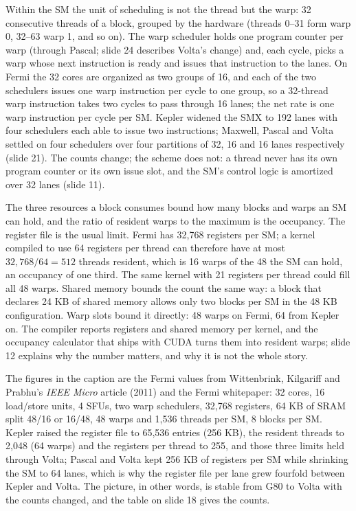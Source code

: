 \documentclass[11pt,letterpaper]{article}
\begin{document}
Within the SM the unit of scheduling is not the thread but the warp: 32 consecutive threads of a block, grouped by the hardware (threads 0--31 form warp 0, 32--63 warp 1, and so on). The warp scheduler holds one program counter per warp (through Pascal; slide 24 describes Volta's change) and, each cycle, picks a warp whose next instruction is ready and issues that instruction to the lanes. On Fermi the 32 cores are organized as two groups of 16, and each of the two schedulers issues one warp instruction per cycle to one group, so a 32-thread warp instruction takes two cycles to pass through 16 lanes; the net rate is one warp instruction per cycle per SM. Kepler widened the SMX to 192 lanes with four schedulers each able to issue two instructions; Maxwell, Pascal and Volta settled on four schedulers over four partitions of 32, 16 and 16 lanes respectively (slide 21). The counts change; the scheme does not: a thread never has its own program counter or its own issue slot, and the SM's control logic is amortized over 32 lanes (slide 11).

The three resources a block consumes bound how many blocks and warps an SM can hold, and the ratio of resident warps to the maximum is the occupancy. The register file is the usual limit. Fermi has 32,768 registers per SM; a kernel compiled to use 64 registers per thread can therefore have at most $32{,}768/64 = 512$ threads resident, which is 16 warps of the 48 the SM can hold, an occupancy of one third. The same kernel with 21 registers per thread could fill all 48 warps. Shared memory bounds the count the same way: a block that declares 24 KB of shared memory allows only two blocks per SM in the 48 KB configuration. Warp slots bound it directly: 48 warps on Fermi, 64 from Kepler on. The compiler reports registers and shared memory per kernel, and the occupancy calculator that ships with CUDA turns them into resident warps; slide 12 explains why the number matters, and why it is not the whole story.

The figures in the caption are the Fermi values from Wittenbrink, Kilgariff and Prabhu's \emph{IEEE Micro} article (2011) and the Fermi whitepaper: 32 cores, 16 load/store units, 4 SFUs, two warp schedulers, 32,768 registers, 64 KB of SRAM split 48/16 or 16/48, 48 warps and 1,536 threads per SM, 8 blocks per SM. Kepler raised the register file to 65,536 entries (256 KB), the resident threads to 2,048 (64 warps) and the registers per thread to 255, and those three limits held through Volta; Pascal and Volta kept 256 KB of registers per SM while shrinking the SM to 64 lanes, which is why the register file per lane grew fourfold between Kepler and Volta. The picture, in other words, is stable from G80 to Volta with the counts changed, and the table on slide 18 gives the counts.
\end{document}
